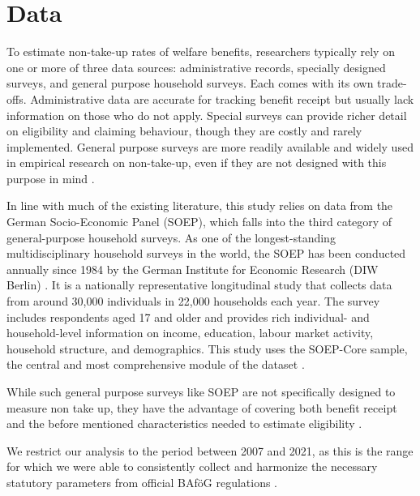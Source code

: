 %
%




\section{Data}
To estimate non-take-up rates of welfare benefits, researchers typically rely on one or more of three data sources: administrative records, specially designed surveys, and general purpose household surveys. 
Each comes with its own trade-offs. 
Administrative data are accurate for tracking benefit receipt but usually lack information on those who do not apply. 
Special surveys can provide richer detail on eligibility and claiming behaviour, though they are costly and rarely implemented. 
General purpose surveys are more readily available and widely used in empirical research on non-take-up, even if they are not designed with this purpose in mind \citep{mechelen_who_2017}.

In line with much of the existing literature, this study relies on data from the German Socio-Economic Panel (SOEP), which falls into the third category of general-purpose household surveys. 
As one of the longest-standing multidisciplinary household surveys in the world, the SOEP has been conducted annually since 1984 by the German Institute for Economic Research (DIW Berlin) \citep{soepcore_v39}. 
It is a nationally representative longitudinal study that collects data from around 30,000 individuals in 22,000 households each year. 
The survey includes respondents aged 17 and older and provides rich individual- and household-level information on income, education, labour market activity, household structure, and demographics. 
This study uses the SOEP-Core sample, the central and most comprehensive module of the dataset \citep{berlin_diw_nodate}.

While such general purpose surveys like SOEP are not specifically designed to measure non take up, they have the advantage of covering both benefit receipt and the before mentioned characteristics needed to estimate eligibility \citep{mechelen_who_2017}.

We restrict our analysis to the period between 2007 and 2021, as this is the range for which we were able to consistently collect and harmonize the necessary statutory parameters from official BAföG regulations \cite{bafoeg_law}. 

